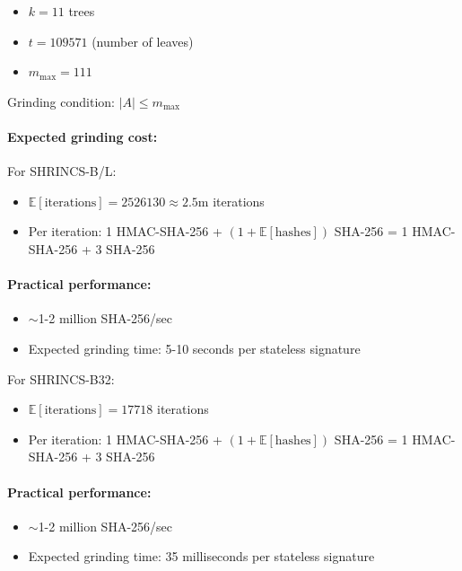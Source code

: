 \begin{itemize}
    \item $k = 11$ trees
    \item $t = 109571$ (number of leaves)
    \item $m_{\max} = 111$
\end{itemize}

Grinding condition: $|A| \le m_{\max}$

\paragraph{Expected grinding cost:}

For SHRINCS-B/L:

\begin{itemize}
    \item $\mathbb{E}[\text{iterations}] = 2526130 \approx 2.5$m iterations
    \item Per iteration: 1 HMAC-SHA-256 + $(1 + \mathbb{E}[\text{hashes}])$ SHA-256 = 1 HMAC-SHA-256 + 3 SHA-256  
\end{itemize}

\paragraph{Practical performance:}
\begin{itemize}
    \item $\sim$1-2 million SHA-256/sec
    \item Expected grinding time: 5-10 seconds per stateless signature
\end{itemize}

For SHRINCS-B32:

\begin{itemize}
    \item $\mathbb{E}[\text{iterations}] = 17718$ iterations
    \item Per iteration: 1 HMAC-SHA-256 + $(1 + \mathbb{E}[\text{hashes}])$ SHA-256 = 1 HMAC-SHA-256 + 3 SHA-256
\end{itemize}

\paragraph{Practical performance:}
\begin{itemize}
    \item $\sim$1-2 million SHA-256/sec
    \item Expected grinding time: 35 milliseconds per stateless signature
\end{itemize}